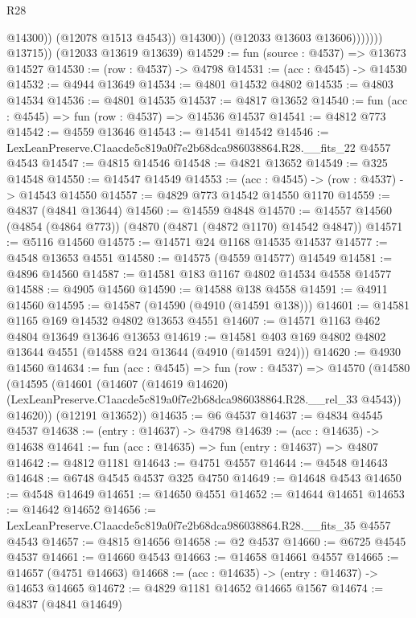 \begin{lexlean}{R28}
\begin{coremodule}
                              @14300))
                          (@12078 @1513 @4543))
                        @14300))
                    (@12033 @13603 @13606)))))))
        @13715))
    (@12033 @13619 @13639)
@14529 := fun (source : @4537) => @13673 @14527
@14530 := (row : @4537) -> @4798
@14531 := (acc : @4545) -> @14530
@14532 := @4944 @13649
@14534 := @4801 @14532 @4802
@14535 := @4803 @14534
@14536 := @4801 @14535
@14537 := @4817 @13652
@14540 := fun (acc : @4545) => fun (row : @4537) => @14536 @14537
@14541 := @4812 @773
@14542 := @4559 @13646
@14543 := @14541 @14542
@14546 := LexLeanPreserve.C1aacde5c819a0f7e2b68dca986038864.R28.__fits_22 @4557 @4543
@14547 := @4815 @14546
@14548 := @4821 @13652
@14549 := @325 @14548
@14550 := @14547 @14549
@14553 := (acc : @4545) -> (row : @4537) -> @14543 @14550
@14557 := @4829 @773 @14542 @14550 @1170
@14559 := @4837 (@4841 @13644)
@14560 := @14559 @4848
@14570 := @14557 @14560 (@4854 (@4864 @773)) (@4870 (@4871 (@4872 @1170) @14542 @4847))
@14571 := @5116 @14560
@14575 := @14571 @24 @1168 @14535 @14537
@14577 := @4548 @13653 @4551
@14580 := @14575 (@4559 @14577) @14549
@14581 := @4896 @14560
@14587 := @14581 @183 @1167 @4802 @14534 @4558 @14577
@14588 := @4905 @14560
@14590 := @14588 @138 @4558
@14591 := @4911 @14560
@14595 := @14587 (@14590 (@4910 (@14591 @138)))
@14601 := @14581 @1165 @169 @14532 @4802 @13653 @4551
@14607 := @14571 @1163 @462 @4804 @13649 @13646 @13653
@14619 := @14581 @403 @169 @4802 @4802 @13644 @4551 (@14588 @24 @13644 (@4910 (@14591 @24)))
@14620 := @4930 @14560
@14634 := fun (acc : @4545) =>
  fun (row : @4537) =>
  @14570
    (@14580
      (@14595
        (@14601
          (@14607
            (@14619 @14620)
            (LexLeanPreserve.C1aacde5c819a0f7e2b68dca986038864.R28.__rel_33 @4543))
          @14620))
      (@12191 @13652))
@14635 := @6 @4537
@14637 := @4834 @4545 @4537
@14638 := (entry : @14637) -> @4798
@14639 := (acc : @14635) -> @14638
@14641 := fun (acc : @14635) => fun (entry : @14637) => @4807
@14642 := @4812 @1181
@14643 := @4751 @4557
@14644 := @4548 @14643
@14648 := @6748 @4545 @4537 @325 @4750
@14649 := @14648 @4543
@14650 := @4548 @14649
@14651 := @14650 @4551
@14652 := @14644 @14651
@14653 := @14642 @14652
@14656 := LexLeanPreserve.C1aacde5c819a0f7e2b68dca986038864.R28.__fits_35 @4557 @4543
@14657 := @4815 @14656
@14658 := @2 @4537
@14660 := @6725 @4545 @4537
@14661 := @14660 @4543
@14663 := @14658 @14661 @4557
@14665 := @14657 (@4751 @14663)
@14668 := (acc : @14635) -> (entry : @14637) -> @14653 @14665
@14672 := @4829 @1181 @14652 @14665 @1567
@14674 := @4837 (@4841 @14649)

\end{coremodule}
\end{lexlean}
